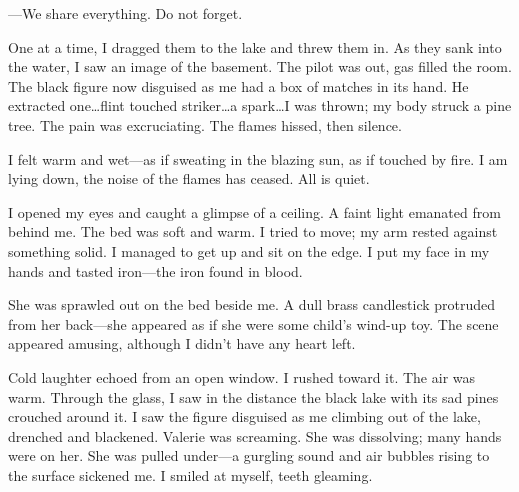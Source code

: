 \documentclass[
]{article}
\begin{document}
---We share everything. Do not forget.

One at a time, I dragged them to the lake and threw them in. As they
sank into the water, I saw an image of the basement. The pilot was out,
gas filled the room. The black figure now disguised as me had a box of
matches in its hand. He extracted one\ldots flint touched
striker\ldots a spark\ldots I was thrown; my body struck a pine tree.
The pain was excruciating. The flames hissed, then silence.

I felt warm and wet---as if sweating in the blazing sun, as if touched
by fire. I am lying down, the noise of the flames has ceased. All is
quiet.

I opened my eyes and caught a glimpse of a ceiling. A faint light
emanated from behind me. The bed was soft and warm. I tried to move; my
arm rested against something solid. I managed to get up and sit on the
edge. I put my face in my hands and tasted iron---the iron found in
blood.

She was sprawled out on the bed beside me. A dull brass candlestick
protruded from her back---she appeared as if she were some child's
wind-up toy. The scene appeared amusing, although I didn't have any
heart left.

Cold laughter echoed from an open window. I rushed toward it. The air
was warm. Through the glass, I saw in the distance the black lake with
its sad pines crouched around it. I saw the figure disguised as me
climbing out of the lake, drenched and blackened. Valerie was screaming.
She was dissolving; many hands were on her. She was pulled under---a
gurgling sound and air bubbles rising to the surface sickened me. I
smiled at myself, teeth gleaming.
\end{document}
